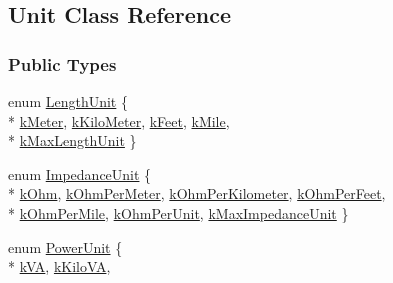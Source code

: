 \hypertarget{class_unit}{}\subsection{Unit Class Reference}
\label{class_unit}
\subsubsection*{Public Types}
\begin{DoxyCompactItemize}
\item 
enum \hyperlink{class_unit_a8c8921f7b225ad6063b1cb573425b9a0}{Length\+Unit} \{ \\*
\hyperlink{class_unit_a8c8921f7b225ad6063b1cb573425b9a0abfa41ebe7ee649a1f02c9b8ae570434b}{k\+Meter}, 
\hyperlink{class_unit_a8c8921f7b225ad6063b1cb573425b9a0a1c04f3dd196dbe1832a2658215b0d919}{k\+Kilo\+Meter}, 
\hyperlink{class_unit_a8c8921f7b225ad6063b1cb573425b9a0a9ac9b167b0ebce477fb53d6ace04ddc8}{k\+Feet}, 
\hyperlink{class_unit_a8c8921f7b225ad6063b1cb573425b9a0a2ebde742068bbee0510de32fbb4cd724}{k\+Mile}, 
\\*
\hyperlink{class_unit_a8c8921f7b225ad6063b1cb573425b9a0a6024a086b73d4d2200b770926b04c290}{k\+Max\+Length\+Unit}
 \}
\item 
enum \hyperlink{class_unit_a3747e779c805df24a71961290be3fbdf}{Impedance\+Unit} \{ \\*
\hyperlink{class_unit_a3747e779c805df24a71961290be3fbdfa6b9c74d1763eefbaf751eeecff0bd9da}{k\+Ohm}, 
\hyperlink{class_unit_a3747e779c805df24a71961290be3fbdfa35e9ca44deb5a35fdb576111cf0db336}{k\+Ohm\+Per\+Meter}, 
\hyperlink{class_unit_a3747e779c805df24a71961290be3fbdfa56a0289d2ddeff7ca4aa8ba410df79d6}{k\+Ohm\+Per\+Kilometer}, 
\hyperlink{class_unit_a3747e779c805df24a71961290be3fbdfa433b57934ca3be960ec7a60f3ea6ea87}{k\+Ohm\+Per\+Feet}, 
\\*
\hyperlink{class_unit_a3747e779c805df24a71961290be3fbdfa1d5bb04c9ecda66b09891af21cd4f613}{k\+Ohm\+Per\+Mile}, 
\hyperlink{class_unit_a3747e779c805df24a71961290be3fbdfa9327dc8628a47375d70037499f9d0910}{k\+Ohm\+Per\+Unit}, 
\hyperlink{class_unit_a3747e779c805df24a71961290be3fbdfaea617e6d3085001a8915240390b349a2}{k\+Max\+Impedance\+Unit}
 \}
\item 
enum \hyperlink{class_unit_ace265ae255370ccacfd5370337572c3b}{Power\+Unit} \{ \\*
\hyperlink{class_unit_ace265ae255370ccacfd5370337572c3ba72b181a842ae2759488a2fa1410d3696}{k\+V\+A}, 
\hyperlink{class_unit_ace265ae255370ccacfd5370337572c3bac9e5154522fbb810d7aed75c3ff47cb2}{k\+Kilo\+V\+A}, 

\end{DoxyCompactItemize}
